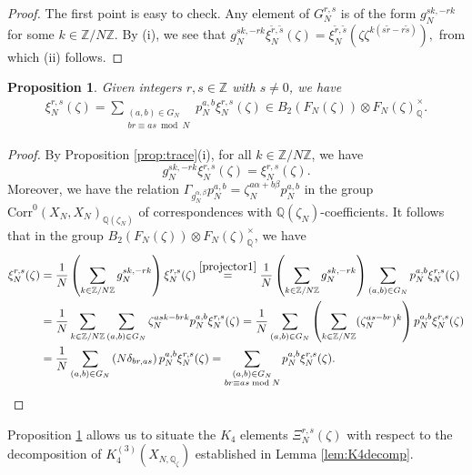\documentclass[11pt,a4,leqno]{amsart}
\theoremstyle{my theoremstyle}
\newtheorem{prop}[thm]{Proposition}
\theoremstyle{dfn}
\theoremstyle{remark}
\renewcommand{\1}{\mathbbm{1}}
\newcommand{\Z}{\mathbb{Z}}
\newcommand{\Q}{\mathbb{Q}}
\newcommand{\z}{\zeta}
\numberwithin{equation}{section}
\begin{document}
\begin{proof}
The first point is easy to check. Any element of $G_N^{r,s}$ is of the form $g_N^{sk,-rk}$ for some $k\in \Z/N\Z$. By (i), we see that 
$
g_N^{sk,-rk}\xi_N^{\tilde r, \tilde s}(\z)=\xi_N^{\tilde r, \tilde s}(\z\z^{k(s\tilde r -r \tilde s)}),
$
from which (ii) follows.
\end{proof}

\begin{prop} \label{projection}
Given integers $r,s\in \Z$ with $s\neq 0$, we have 
\begin{align*}
\xi^{r, s}_N(\zeta)= \sum_{\substack{(a,b) \in G_N \\ br \equiv as \bmod{N}}} p_N^{a,b} \xi^{r, s}_N(\zeta) \in B_2(F_N(\z))\otimes F_N(\z)^\times_{\Q}. 
\end{align*}
\end{prop}
\begin{proof}
By Proposition \ref{prop:trace}(i), for all $k\in \Z/N\Z$, we have
\begin{equation*}
g_N^{sk,-rk} \xi^{r, s}_N(\zeta) = \xi^{r, s}_N(\zeta).
\end{equation*}
Moreover, we have the relation $\Gamma_{g_N^{\alpha,\beta}} p_N^{a,b} = \zeta_N^{a\alpha+b\beta} p_N^{a,b}$ in the group $\mathrm{Corr}^0(X_N,X_N)_{\Q(\z_N)}$ of correspondences with $\Q(\zeta_N)$-coefficients. 
It follows that in the group $B_2(F_N(\z))\otimes F_N(\z)^\times_{\Q}$, we have
\begin{align*}
\xi^{r, s}_N(\zeta) & = \frac1N\left(\sum_{k \in \Z/N\Z} g_N^{sk, -rk}\right) \xi^{r, s}_N(\zeta)
 \overset{\eqref{projector1}}{=} \frac1N\left(\sum_{k \in \Z/N\Z} g_N^{sk, -rk}\right) \sum_{(a, b) \in G_N} p_N^{a, b} \xi^{r, s}_N(\zeta) \\
& = \frac1N \sum_{k \in \Z/N\Z} \sum_{(a,b) \in G_N} \zeta_N^{ask-brk} p_N^{a,b} \xi^{r, s}_N(\zeta)  
= \frac1N  \sum_{(a,b) \in G_N} \left( \sum_{k \in \Z/N\Z} (\zeta_N^{as-br})^k \right) p_N^{a,b} \xi^{r, s}_N(\zeta)  \\
& = \frac1N  \sum_{(a,b) \in G_N} \left( N\delta_{br,as} \right) p_N^{a,b} \xi^{r, s}_N(\zeta)  
= \sum_{\substack{(a,b) \in G_N \\ br \equiv as \bmod{N}}} p_N^{a,b} \xi^{r, s}_N(\zeta) .
\end{align*}
\end{proof}

Proposition \ref{projection} allows us to situate the $K_4$ elements $\Xi_N^{r,s}(\z)$ with respect to the decomposition of $K_4^{(3)}(X_{N,\Q_\z})$ established in Lemma \ref{lem:K4decomp}.
\end{document}
